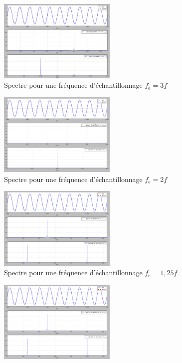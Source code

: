 \documentclass[a4paper]{article}
\begin{document}
	\begin{multicols}{2}
		\begin{figure}[H]
			\centering
			\includegraphics[width=0.5\textwidth]{figures/Capture4.png}
			\caption{Spectre pour une fréquence d'échantillonnage $f_\text{e} = 3f$}
		\end{figure}
		\begin{figure}[H]
			\centering
			\includegraphics[width=0.5\textwidth]{figures/Capture5.png}
			\caption{Spectre pour une fréquence d'échantillonnage $f_\text{e} = 2f$}
		\end{figure}
		\begin{figure}[H]
			\centering
			\includegraphics[width=0.5\textwidth]{figures/Capture6.png}
			\caption{Spectre pour une fréquence d'échantillonnage $f_\text{e} = 1{,}25f$}
		\end{figure}
		\begin{figure}[H]
			\centering
			\includegraphics[width=0.5\textwidth]{figures/Capture6.png}

\end{figure}
\end{multicols}
\end{document}
